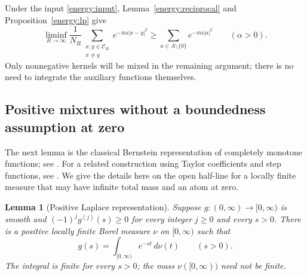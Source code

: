 \documentclass[11pt]{article}
\newtheorem{lemma}[theorem]{Lemma}
\theoremstyle{remark}\newtheorem{remark}[theorem]{Remark}
\begin{document}
Under the input \eqref{energy:input}, Lemma~\ref{energy:reciprocal}
and Proposition~\ref{energy:lp} give
\begin{equation}
 \liminf_{R\to\infty}\frac1{N_R}
 \sum_{\substack{x,y\in\mathcal C_R\\x\ne y}}e^{-\pi\alpha|x-y|^2}
 \ge \sum_{a\in A\setminus\{0\}}e^{-\pi\alpha|a|^2}
 \qquad(\alpha>0).
 \label{energy:gaussian}
\end{equation}
Only nonnegative kernels will be mixed in the remaining argument;
there is no need to integrate the auxiliary functions themselves.

\subsection{Positive mixtures without a boundedness assumption at zero}

The next lemma is the classical Bernstein representation of completely
monotone functions; see \cite[Theorem~8]{Widder1931}.
For a related construction using Taylor coefficients and step functions,
see \cite[Sections~I--II]{Dubourdieu1940}. We give the details here on the
open half-line for a locally finite measure that may have infinite total
mass and an atom at zero.

\begin{lemma}[Positive Laplace representation]
\label{energy:laplace}
Suppose $g:(0,\infty)\to[0,\infty)$ is smooth and
$(-1)^j g^{(j)}(s)\ge0$ for every integer $j\ge0$ and every $s>0$.
There is a positive locally finite Borel measure $\nu$ on $[0,\infty)$
such that
\begin{equation}
 g(s)=\int_{[0,\infty)}e^{-st}\,d\nu(t)\qquad(s>0).
 \label{energy:laplace-representation}
\end{equation}
The integral is finite for every $s>0$; the mass $\nu([0,\infty))$
need not be finite.
\end{lemma}
\end{document}
